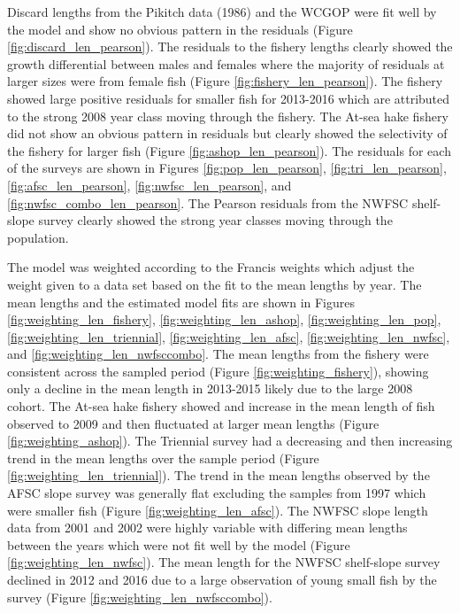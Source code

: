\documentclass[12pt,]{article}
\begin{document}
Discard lengths from the Pikitch data (1986) and the WCGOP were fit well
by the model and show no obvious pattern in the residuals (Figure
\ref{fig:discard_len_pearson}). The residuals to the fishery lengths
clearly showed the growth differential between males and females where
the majority of residuals at larger sizes were from female fish (Figure
\ref{fig:fishery_len_pearson}). The fishery showed large positive
residuals for smaller fish for 2013-2016 which are attributed to the
strong 2008 year class moving through the fishery. The At-sea hake
fishery did not show an obvious pattern in residuals but clearly showed
the selectivity of the fishery for larger fish (Figure
\ref{fig:ashop_len_pearson}). The residuals for each of the surveys are
shown in Figures \ref{fig:pop_len_pearson}, \ref{fig:tri_len_pearson},
\ref{fig:afsc_len_pearson}, \ref{fig:nwfsc_len_pearson}, and
\ref{fig:nwfsc_combo_len_pearson}. The Pearson residuals from the NWFSC
shelf-slope survey clearly showed the strong year classes moving through
the population.

The model was weighted according to the Francis weights which adjust the
weight given to a data set based on the fit to the mean lengths by year.
The mean lengths and the estimated model fits are shown in Figures
\ref{fig:weighting_len_fishery}, \ref{fig:weighting_len_ashop},
\ref{fig:weighting_len_pop}, \ref{fig:weighting_len_triennial},
\ref{fig:weighting_len_afsc}, \ref{fig:weighting_len_nwfsc}, and
\ref{fig:weighting_len_nwfsccombo}. The mean lengths from the fishery
were consistent across the sampled period (Figure
\ref{fig:weighting_fishery}), showing only a decline in the mean length
in 2013-2015 likely due to the large 2008 cohort. The At-sea hake
fishery showed and increase in the mean length of fish observed to 2009
and then fluctuated at larger mean lengths (Figure
\ref{fig:weighting_ashop}). The Triennial survey had a decreasing and
then increasing trend in the mean lengths over the sample period (Figure
\ref{fig:weighting_len_triennial}). The trend in the mean lengths
observed by the AFSC slope survey was generally flat excluding the
samples from 1997 which were smaller fish (Figure
\ref{fig:weighting_len_afsc}). The NWFSC slope length data from 2001 and
2002 were highly variable with differing mean lengths between the years
which were not fit well by the model (Figure
\ref{fig:weighting_len_nwfsc}). The mean length for the NWFSC
shelf-slope survey declined in 2012 and 2016 due to a large observation
of young small fish by the survey (Figure
\ref{fig:weighting_len_nwfsccombo}).
\end{document}
